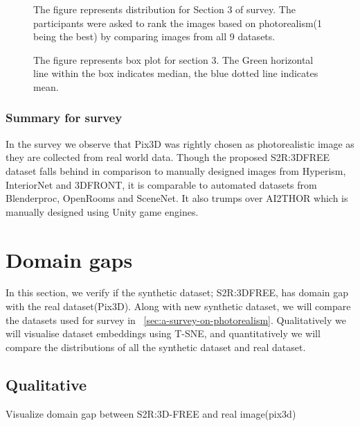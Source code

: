 \begin{figure}
    \centering
    \resizebox{\textwidth}{!}{}
    \caption{The figure represents distribution for Section 3 of survey. The participants were asked to rank the images based on photorealism(1 being the best) by comparing images from all 9 datasets.}
    \label{fig:question3}
\end{figure}

\begin{figure}
    \centering
    \resizebox{0.75\textwidth}{!}{}
    \caption{The figure represents box plot for section 3. The Green horizontal line within the box indicates median, the blue dotted line indicates mean.}
    \label{fig:question3_2}
\end{figure}

\subsubsection{Summary for survey}
In the survey we observe that Pix3D was rightly chosen as photorealistic image as they are collected from real world data.
Though the proposed S2R:3DFREE dataset falls behind in comparison to manually designed images from Hyperism, InteriorNet and 3DFRONT,
it is comparable to automated datasets from Blenderproc, OpenRooms and SceneNet.
It also trumps over AI2THOR which is manually designed using Unity game engines.

\section{Domain gaps}\label{sec:domain-gaps}

In this section, we verify if the synthetic dataset;
S2R:3DFREE, has domain gap with the real dataset(Pix3D).
Along with new synthetic dataset, we will compare the datasets used for survey in ~\ref{sec:a-survey-on-photorealism}.
Qualitatively we will visualise dataset embeddings using T-SNE, and quantitatively we will compare the distributions of all the synthetic dataset and real dataset.

\subsection{Qualitative}\label{subsec:qualitative}
Visualize domain gap between S2R:3D-FREE and real image(pix3d)

